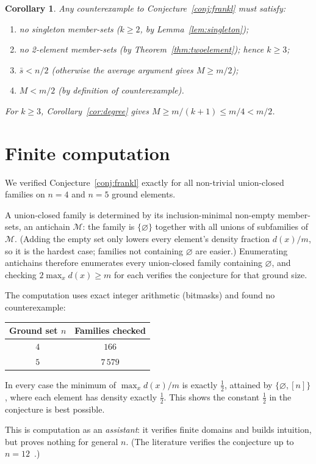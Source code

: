 \documentclass[11pt]{article}
\newtheorem{corollary}[theorem]{Corollary}
\theoremstyle{definition}
\theoremstyle{remark}
\newcommand{\Nhalf}{\tfrac{1}{2}}
\begin{document}
\begin{corollary}
Any counterexample to Conjecture~\ref{conj:frankl} must satisfy:
\begin{enumerate}
\item no singleton member-sets ($k\ge2$, by Lemma~\ref{lem:singleton});
\item no 2-element member-sets (by Theorem~\ref{thm:twoelement}); hence $k\ge3$;
\item $\bar s<n/2$ (otherwise the average argument gives $M\ge m/2$);
\item $M<m/2$ (by definition of counterexample).
\end{enumerate}
For $k\ge3$, Corollary~\ref{cor:degree} gives $M\ge m/(k+1)\le m/4<m/2$.
\end{corollary}

\section{Finite computation}

We verified Conjecture~\ref{conj:frankl} exactly for all non-trivial
union-closed families on $n=4$ and $n=5$ ground elements.

A union-closed family is determined by its inclusion-minimal non-empty
member-sets, an antichain $\mathcal M$: the family is $\{\varnothing\}$
together with all unions of subfamilies of $\mathcal M$. (Adding the empty
set only lowers every element's density fraction $d(x)/m$, so it is the
hardest case; families not containing $\varnothing$ are easier.) Enumerating
antichains therefore enumerates every union-closed family containing
$\varnothing$, and checking $2\max_x d(x)\ge m$ for each verifies the
conjecture for that ground size.

The computation uses exact integer arithmetic (bitmasks) and found no
counterexample:
\begin{center}
\begin{tabular}{c|c}
Ground set $n$ & Families checked \\ \hline
$4$ & $166$ \\
$5$ & $7\,579$
\end{tabular}
\end{center}
In every case the minimum of $\max_x d(x)/m$ is exactly $\Nhalf$, attained by
$\{\varnothing,[n]\}$, where each element has density exactly $\Nhalf$. This
shows the constant $\Nhalf$ in the conjecture is best possible.

This is computation as an \emph{assistant}: it verifies finite domains and
builds intuition, but proves nothing for general $n$. (The literature verifies
the conjecture up to $n=12$~\cite{zivkovic2024}.)
\end{document}
